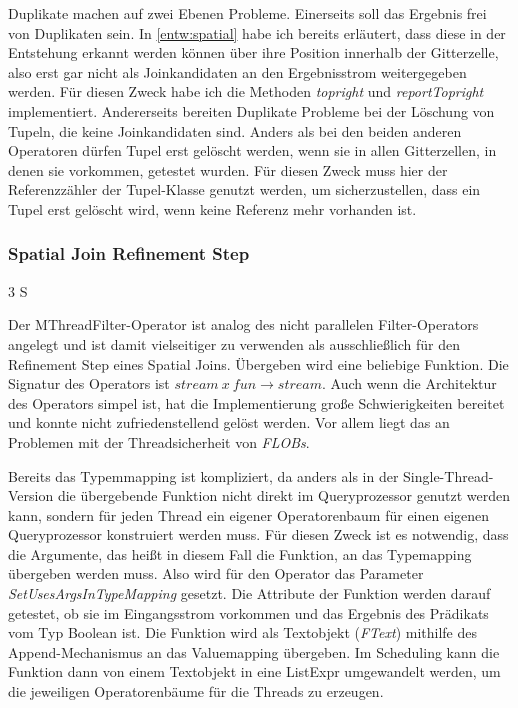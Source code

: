 \documentclass[a4paper,12pt,twoside]{article}
\newcommand{\Fb}[1]{\textit{#1}} %
\begin{document}
Duplikate machen auf zwei Ebenen Probleme. Einerseits soll das Ergebnis frei von Duplikaten sein. In \autoref{entw:spatial} habe ich bereits erläutert, dass diese in der Entstehung erkannt werden können über ihre Position innerhalb der Gitterzelle, also erst gar nicht als Joinkandidaten an den Ergebnisstrom weitergegeben werden. Für diesen Zweck habe ich die Methoden \Fb{topright} und \Fb{reportTopright} implementiert. Andererseits bereiten Duplikate Probleme bei der Löschung von Tupeln, die keine Joinkandidaten sind. Anders als bei den beiden anderen Operatoren dürfen Tupel erst gelöscht werden, wenn sie in allen Gitterzellen, in denen sie vorkommen, getestet wurden. Für diesen Zweck muss hier der Referenzzähler der Tupel-Klasse genutzt werden, um sicherzustellen, dass ein Tupel erst gelöscht wird, wenn keine Referenz mehr vorhanden ist.

\subsubsection{Spatial Join Refinement Step} 3 S
\label{impl:refinement}

Der MThreadFilter-Operator ist analog des nicht parallelen Filter-Operators angelegt und ist damit vielseitiger zu verwenden als ausschließlich für den Refinement Step eines Spatial Joins. Übergeben wird eine beliebige Funktion. Die Signatur des Operators ist $stream~x~fun \longrightarrow stream$. Auch wenn die Architektur des Operators simpel ist, hat die Implementierung große Schwierigkeiten bereitet und konnte nicht zufriedenstellend gelöst werden. Vor allem liegt das an Problemen mit der Threadsicherheit von \Fb{FLOBs}.

Bereits das Typemmapping ist kompliziert, da anders als in der Single-Thread-Version die übergebende Funktion nicht direkt im Queryprozessor genutzt werden kann, sondern für jeden Thread ein eigener Operatorenbaum für einen eigenen Queryprozessor konstruiert werden muss. Für diesen Zweck ist es notwendig, dass die Argumente, das heißt in diesem Fall die Funktion, an das Typemapping übergeben werden muss. Also wird für den Operator das Parameter \Fb{SetUsesArgsInTypeMapping} gesetzt. Die Attribute der Funktion werden darauf getestet, ob sie im Eingangsstrom vorkommen und das Ergebnis des Prädikats vom Typ Boolean ist. Die Funktion wird als Textobjekt (\Fb{FText}) mithilfe des Append-Mechanismus an das Valuemapping übergeben. Im Scheduling kann die Funktion dann von einem Textobjekt in eine ListExpr umgewandelt werden, um die jeweiligen Operatorenbäume für die Threads zu erzeugen.
\end{document}
